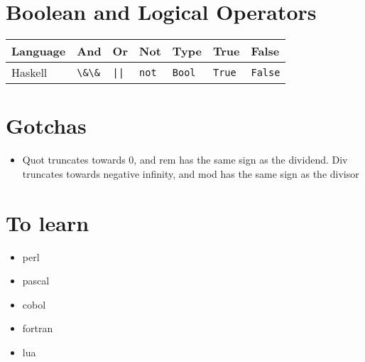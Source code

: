 \documentclass{article}
\begin{document}
\section{Boolean and Logical Operators}
\begin{longtabu} to 0.75\linewidth{ X X X  X X X X }
	Language & And & Or & Not & Type & True & False \\
	\hline
	Haskell & \lstinline$\&\&$ & \lstinline$||$ & \lstinline$not$ & \lstinline$Bool$ & \lstinline$True$ & \lstinline$False$ \\
\end{longtabu}

\section{Gotchas}
\begin{itemize}
	\item Quot truncates towards 0, and rem has the same sign as the dividend. Div truncates towards negative infinity, and mod has the same sign as the divisor
\end{itemize}

\section{To learn}
\begin{itemize}
	\item perl
	\item pascal
	\item cobol
	\item fortran
	\item lua
\end{itemize}
\end{document}
